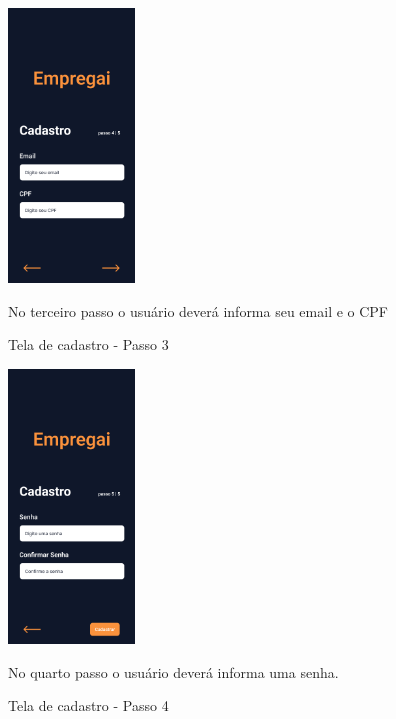 \begin{figure}[hbb]
	\caption{Tela de cadastro - Passo 3}
	\begin{center}
		\includegraphics[width=0.3\textwidth]{images/Cadastro-4.png}
	\end{center}
	No terceiro passo o usuário deverá informa seu email e o CPF
\end{figure}

\begin{figure}[hbb]
	\caption{Tela de cadastro - Passo 4}
	\begin{center}
		\includegraphics[width=0.3\textwidth]{images/Cadastro-5.png}
	\end{center}
	No quarto passo o usuário deverá informa uma senha.
\end{figure}

